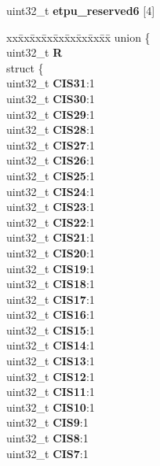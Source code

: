 \begin{DoxyCompactItemize}
\begin{tabbing}
\end{tabbing}\item 
\mbox{\label{structETPU__tag_a5326d1389983e4f6ec3914c7dfddb5ec}} 
uint32\+\_\+t {\bfseries etpu\+\_\+reserved6} \mbox{[}4\mbox{]}
\item 
\mbox{\label{structETPU__tag_aa1849683f892dbda84d8bdeb339e75f6}} 
\begin{tabbing}
xx\=xx\=xx\=xx\=xx\=xx\=xx\=xx\=xx\=\kill
union \{\\
\>uint32\_t {\bfseries R}\\
\>struct \{\\
\>\>uint32\_t {\bfseries CIS31}:1\\
\>\>uint32\_t {\bfseries CIS30}:1\\
\>\>uint32\_t {\bfseries CIS29}:1\\
\>\>uint32\_t {\bfseries CIS28}:1\\
\>\>uint32\_t {\bfseries CIS27}:1\\
\>\>uint32\_t {\bfseries CIS26}:1\\
\>\>uint32\_t {\bfseries CIS25}:1\\
\>\>uint32\_t {\bfseries CIS24}:1\\
\>\>uint32\_t {\bfseries CIS23}:1\\
\>\>uint32\_t {\bfseries CIS22}:1\\
\>\>uint32\_t {\bfseries CIS21}:1\\
\>\>uint32\_t {\bfseries CIS20}:1\\
\>\>uint32\_t {\bfseries CIS19}:1\\
\>\>uint32\_t {\bfseries CIS18}:1\\
\>\>uint32\_t {\bfseries CIS17}:1\\
\>\>uint32\_t {\bfseries CIS16}:1\\
\>\>uint32\_t {\bfseries CIS15}:1\\
\>\>uint32\_t {\bfseries CIS14}:1\\
\>\>uint32\_t {\bfseries CIS13}:1\\
\>\>uint32\_t {\bfseries CIS12}:1\\
\>\>uint32\_t {\bfseries CIS11}:1\\
\>\>uint32\_t {\bfseries CIS10}:1\\
\>\>uint32\_t {\bfseries CIS9}:1\\
\>\>uint32\_t {\bfseries CIS8}:1\\
\>\>uint32\_t {\bfseries CIS7}:1\\

\end{tabbing}
\end{DoxyCompactItemize}
